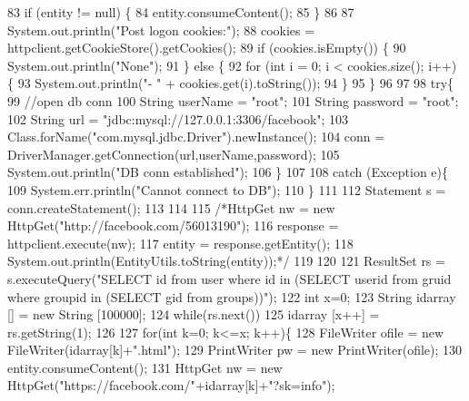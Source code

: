 \begin{DoxyCode}
83      \textcolor{keywordflow}{if} (entity != null) \{
84          entity.consumeContent();
85      \}
86 
87      System.out.println(\textcolor{stringliteral}{"Post logon cookies:"});
88      cookies = httpclient.getCookieStore().getCookies();
89      \textcolor{keywordflow}{if} (cookies.isEmpty()) \{
90          System.out.println(\textcolor{stringliteral}{"None"});
91      \} \textcolor{keywordflow}{else} \{
92          \textcolor{keywordflow}{for} (\textcolor{keywordtype}{int} i = 0; i < cookies.size(); i++) \{
93              System.out.println(\textcolor{stringliteral}{"- "} + cookies.get(i).toString());
94          \}
95      \}
96 
97         
98         \textcolor{keywordflow}{try}\{
99             \textcolor{comment}{//open db conn}
100             String userName = \textcolor{stringliteral}{"root"};
101             String password = \textcolor{stringliteral}{"root"};
102             String url = \textcolor{stringliteral}{"jdbc:mysql://127.0.0.1:3306/facebook"};
103                 Class.forName(\textcolor{stringliteral}{"com.mysql.jdbc.Driver"}).newInstance();
104                 conn = DriverManager.getConnection(url,userName,password);
105                 System.out.println(\textcolor{stringliteral}{"DB conn established"});
106         \}
107         
108         \textcolor{keywordflow}{catch} (Exception e)\{
109             System.err.println(\textcolor{stringliteral}{"Cannot connect to DB"});
110         \}
111         
112         Statement s = conn.createStatement();
113         
114     
115         \textcolor{comment}{/*HttpGet nw = new HttpGet("http://facebook.com/56013190");}
116 \textcolor{comment}{        response = httpclient.execute(nw);}
117 \textcolor{comment}{        entity = response.getEntity();}
118 \textcolor{comment}{        System.out.println(EntityUtils.toString(entity));*/}
119         
120     
121         ResultSet rs = s.executeQuery(\textcolor{stringliteral}{"SELECT id from user where id in (SELECT userid from gruid where
       groupid in (SELECT gid from groups))"});
122         \textcolor{keywordtype}{int} x=0;
123         String idarray [] = \textcolor{keyword}{new} String [100000];
124         \textcolor{keywordflow}{while}(rs.next())
125         idarray [x++] = rs.getString(1);
126         
127         \textcolor{keywordflow}{for}(\textcolor{keywordtype}{int} k=0; k<=x; k++)\{
128         FileWriter ofile = \textcolor{keyword}{new} FileWriter(idarray[k]+\textcolor{stringliteral}{".html"});
129         PrintWriter pw = \textcolor{keyword}{new} PrintWriter(ofile);
130         entity.consumeContent();
131         HttpGet nw = \textcolor{keyword}{new} HttpGet(\textcolor{stringliteral}{"https://facebook.com/"}+idarray[k]+\textcolor{stringliteral}{"?sk=info"});

\end{DoxyCode}
